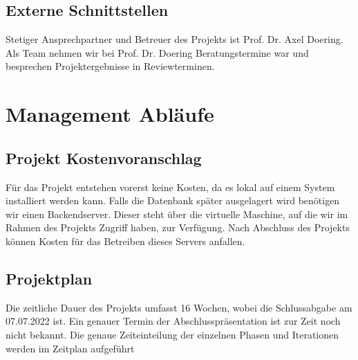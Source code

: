 \documentclass[12pt,a4paper,onecolumn]{article}
\begin{document}
\subsection{Externe Schnittstellen}
Stetiger Ansprechpartner und Betreuer des Projekts ist Prof. Dr. Axel Doering. Als Team nehmen wir bei Prof. Dr. Doering Beratungstermine war und besprechen Projektergebnisse in Reviewterminen. 

\section{Management Abläufe}
\subsection{Projekt Kostenvoranschlag}
Für das Projekt entstehen vorerst keine Kosten, da es lokal auf einem System installiert werden kann. Falls die Datenbank später ausgelagert wird benötigen wir
einen Backendserver. Dieser steht über die virtuelle Maschine, auf die wir im Rahmen des Projekts Zugriff haben, zur Verfügung. Nach Abschluss des Projekts können Kosten für das Betreiben dieses Servers anfallen.
\subsection{Projektplan}
Die zeitliche Dauer des Projekts umfasst 16 Wochen, wobei die Schlussabgabe am 07.07.2022 ist. Ein genauer Termin der Abschlusspräsentation ist zur Zeit noch nicht bekannt. Die genaue Zeiteinteilung der einzelnen Phasen und Iterationen werden im Zeitplan aufgeführt
\end{document}
